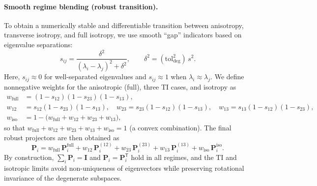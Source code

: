 \paragraph{Smooth regime blending (robust transition).}
To obtain a numerically stable and differentiable transition between anisotropy, transverse isotropy, and
full isotropy, we use smooth ``gap'' indicators based on eigenvalue separations:
\begin{equation}
\label{eq:gap_indicator}
s_{ij}=\frac{\delta^2}{(\lambda_i-\lambda_j)^2+\delta^2},\qquad
\delta^2 = (\mathrm{tol}_{\mathrm{deg}}^2)\,s^2.
\end{equation}
Here, $s_{ij}\approx 0$ for well-separated eigenvalues and $s_{ij}\approx 1$ when $\lambda_i\approx\lambda_j$.
We define nonnegative weights for the anisotropic (full), three TI cases, and isotropy as
\begin{align}
w_{\mathrm{full}}&=(1-s_{12})(1-s_{23})(1-s_{13}), \nonumber\\
w_{12}&=s_{12}(1-s_{23})(1-s_{13}),\quad
w_{23}=s_{23}(1-s_{12})(1-s_{13}),\quad
w_{13}=s_{13}(1-s_{12})(1-s_{23}), \nonumber\\
w_{\mathrm{iso}}&=1-\bigl(w_{\mathrm{full}}+w_{12}+w_{23}+w_{13}\bigr),
\end{align}
so that $w_{\mathrm{full}}+w_{12}+w_{23}+w_{13}+w_{\mathrm{iso}}=1$ (a convex combination). The final robust projectors are then obtained as
\begin{equation}
\label{eq:final_blend}
\mathbf{P}_i
=
w_{\mathrm{full}}\,\mathbf{P}_i^{\mathrm{full}}
+w_{12}\,\mathbf{P}_i^{(12)}
+w_{23}\,\mathbf{P}_i^{(23)}
+w_{13}\,\mathbf{P}_i^{(13)}
+w_{\mathrm{iso}}\,\mathbf{P}_i^{\mathrm{iso}}.
\end{equation}
By construction, $\sum_i \mathbf{P}_i=\mathbf{I}$ and $\mathbf{P}_i=\mathbf{P}_i^{\mathsf T}$ hold in all regimes,
and the TI and isotropic limits avoid non-uniqueness of eigenvectors while preserving rotational invariance of the
degenerate subspaces.

